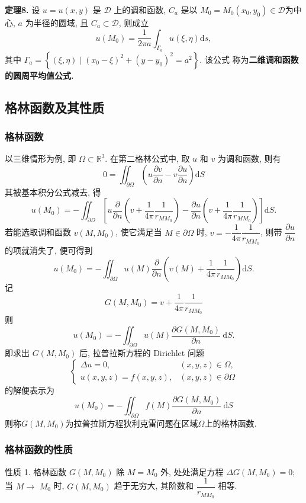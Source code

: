 \textbf{定理8. }设 $ u=u(x, y) $ 是 $ \mathcal{D} $ 上的调和函数, $ C_{a} $ 是以 $ M_{0}=M_{0}\left(x_{0}, y_{0}\right) \in \mathcal{D} $为中心, $ a $ 为半径的圆域, 且 $ C_{a} \subset \mathcal{D} $, 则成立
$$
u\left(M_{0}\right)=\frac{1}{2 \pi a} \int_{\Gamma_{a}} u(\xi, \eta) \mathrm{d} s,
$$
其中 $ \Gamma_{a}=\left\{(\xi, \eta) \mid\left(x_{0}-\xi\right)^{2}+\left(y-y_{0}\right)^{2}=a^{2}\right\} $. 该公式 称为\textbf{二维调和函数的圆周平均值公式.}

\subsection{格林函数及其性质}
\subsubsection{格林函数}
以三维情形为例, 即 $ \Omega \subset \mathbb{R}^{3} $. 在第二格林公式中, 取 $ u $ 和 $ v $ 为调和函数, 则有
$$
0=\iint_{\partial \Omega}\left(u \frac{\partial v}{\partial n}-v \frac{\partial u}{\partial n}\right) \mathrm{d} S
$$
其被基本积分公式减去, 得
$$
u\left(M_{0}\right)=-\iint_{\partial \Omega}\left[u \frac{\partial}{\partial n}\left(v+\frac{1}{4 \pi} \frac{1}{r_{M M_{0}}}\right)-\frac{\partial u}{\partial n}\left(v+\frac{1}{4 \pi} \frac{1}{r_{M M_{0}}}\right)\right] \mathrm{d} S .
$$
若能选取调和函数 $ v\left(M, M_{0}\right) $, 使它满足当 $ M \in \partial \Omega $ 时, $ v=-\dfrac{1}{4 \pi} \dfrac{1}{r_{M M_{0}}} $, 则带 $ \dfrac{\partial u}{\partial n} $ 的项就消失了, 便可得到
$$
u\left(M_{0}\right)=-\iint_{\partial \Omega} u(M) \frac{\partial}{\partial n}\left(v(M)+\frac{1}{4 \pi} \frac{1}{r_{M M_{0}}}\right) \mathrm{d} S .
$$
记
$$
G\left(M, M_{0}\right)=v+\frac{1}{4 \pi} \frac{1}{r_{M M_{0}}}
$$
则
$$
u\left(M_{0}\right)=-\iint_{\partial \Omega} u(M) \frac{\partial G\left(M, M_{0}\right)}{\partial n} \mathrm{~d} S .
$$
即求出 $ G\left(M, M_{0}\right) $ 后, 拉普拉斯方程的 Dirichlet 问题
$$
\left\{\begin{array}{ll}
\Delta u=0, & (x, y, z) \in \Omega, \\
u(x, y, z)=f(x, y, z), & (x, y, z) \in \partial \Omega
\end{array}\right.
$$
的解便表示为
$$
u\left(M_{0}\right)=-\iint_{\partial \Omega} f(M) \frac{\partial G\left(M, M_{0}\right)}{\partial n} \mathrm{~d} S
$$
则称$G(M,M_0)$为拉普拉斯方程狄利克雷问题在区域$\Omega$上的格林函数.

\subsubsection{格林函数的性质}
性质 1. 格林函数 $ G \left(M, M_{0}\right) $ 除 $ M=M_{0} $ 外, 处处满足方程 $ \Delta G\left(M, M_{0}\right)=0 $; 当 $ M \rightarrow $ $ M_{0} $ 时, $ G\left(M, M_{0}\right) $ 趋于无穷大, 其阶数和 $ \dfrac{1}{r_{M M_{0}}} $ 相等.

